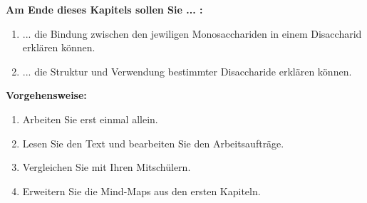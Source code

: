 \documentclass{scrartcl}  %
\begin{document}
		\begin{minipage}{0.7\textwidth}
			\noindent \textbf{Am Ende dieses Kapitels sollen Sie ... :}
			\begin{enumerate}
				\item ... die Bindung zwischen den jewiligen Monosacchariden in einem Disaccharid erklären können.
				\item ... die Struktur und Verwendung bestimmter Disaccharide erklären können.
			\end{enumerate}
			\textbf{Vorgehensweise:}
			\begin{enumerate}
				\item Arbeiten Sie erst einmal allein.
				\item Lesen Sie den Text und bearbeiten Sie den Arbeitsaufträge.
				\item Vergleichen Sie mit Ihren Mitschülern.
				\item Erweitern Sie die Mind-Maps aus den ersten Kapiteln. 
			\end{enumerate}
			
		\end{minipage}
		\hspace{0.1\textwidth}
\end{document}
